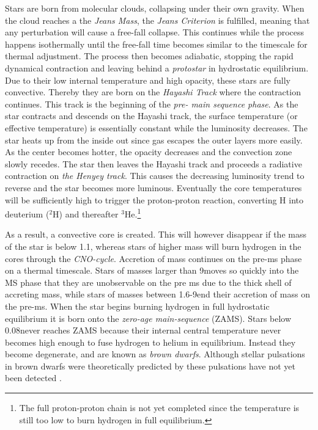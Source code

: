 Stars are born from molecular clouds, collapsing under their own gravity. When the cloud reaches a the \textit{Jeans Mass}, the \textit{Jeans Criterion} is fulfilled, meaning that any perturbation will cause a free-fall collapse. This continues while the process happens isothermally until the free-fall time becomes similar to the timescale for thermal adjustment. The process then becomes adiabatic, stopping the rapid dynamical contraction and leaving behind a \textit{protostar} in hydrostatic equilibrium. Due to their low internal temperature and high opacity, these stars are fully convective. Thereby they are born on the \textit{Hayashi Track} where the contraction continues. This track is the beginning of the \textit{pre- main sequence phase}. As the star contracts and descends on the Hayashi track, the surface temperature (or effective temperature) is essentially constant while the luminosity decreases. The star heats up from the inside out since gas escapes the outer layers more easily. As the center becomes hotter, the opacity decreases and the convection zone slowly recedes. The star then leaves the Hayashi track and proceeds a radiative contraction on \textit{the Henyey track}. This causes the decreasing luminosity trend to reverse and the star becomes more luminous. Eventually the core temperatures will be sufficiently high to trigger the proton-proton reaction, converting H into deuterium ($^{2}\text{H}$) and thereafter $^3\text{He}$.\footnote{The full proton-proton chain is not yet completed since the temperature is still too low to burn hydrogen in full equilibrium.} 


As a result, a convective core is created. This will however disappear if the mass of the star is below 1.1\msun, whereas stars of higher mass will burn hydrogen in the cores through the \textit{CNO-cycle}. Accretion of mass continues on the pre-ms phase on a thermal timescale. Stars of masses larger than 9\msun moves so quickly into the MS phase that they are unobservable on the pre ms due to the thick shell of accreting mass, while stars of masses between 1.6-9\msun end their accretion of mass on the pre-ms. When the star begins burning hydrogen in full hydrostatic equilibrium it is born onto the \textit{zero-age main-sequence} (ZAMS). Stars below 0.08\msun never reaches ZAMS because their internal central temperature never becomes high enough to fuse hydrogen to helium in equilibrium. Instead they become degenerate, and are known as \textit{brown dwarfs}. Although stellar pulsations in brown dwarfs were theoretically predicted by \citet{palla2005pulsating} these pulsations have not yet been detected \citep{aerts2010, cody2014pulsation}. 

